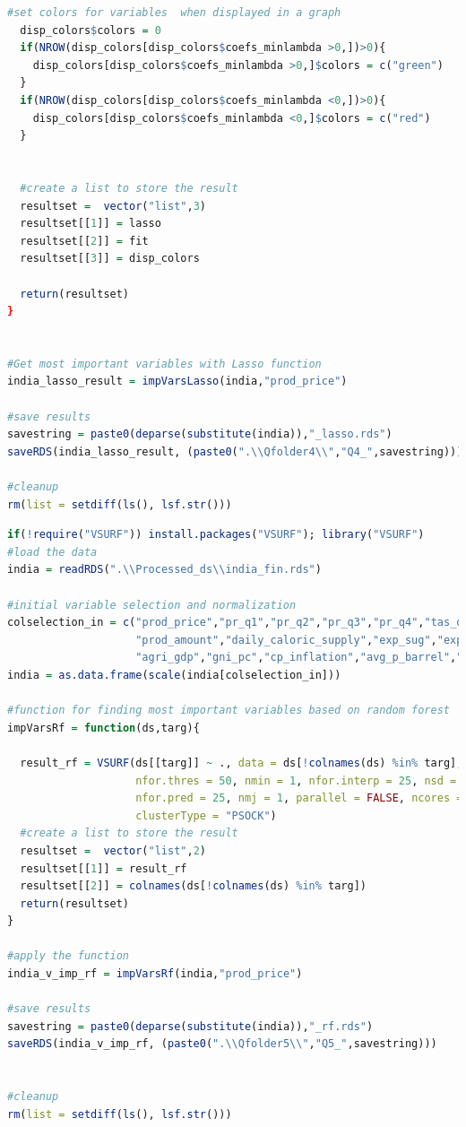 \documentclass[11pt]{article}
\begin{document}
\begin{lstlisting}[language= R]
  #set colors for variables  when displayed in a graph
  disp_colors$colors = 0
  if(NROW(disp_colors[disp_colors$coefs_minlambda >0,])>0){
    disp_colors[disp_colors$coefs_minlambda >0,]$colors = c("green")
  }
  if(NROW(disp_colors[disp_colors$coefs_minlambda <0,])>0){
    disp_colors[disp_colors$coefs_minlambda <0,]$colors = c("red")
  }
  
  
  #create a list to store the result
  resultset =  vector("list",3)
  resultset[[1]] = lasso
  resultset[[2]] = fit
  resultset[[3]] = disp_colors
  
  return(resultset)
}


#Get most important variables with Lasso function
india_lasso_result = impVarsLasso(india,"prod_price")

#save results
savestring = paste0(deparse(substitute(india)),"_lasso.rds")
saveRDS(india_lasso_result, (paste0(".\\Qfolder4\\","Q4_",savestring)))

#cleanup
rm(list = setdiff(ls(), lsf.str()))
\end{lstlisting}


\begin{lstlisting}[language= R]
if(!require("VSURF")) install.packages("VSURF"); library("VSURF")
#load the data
india = readRDS(".\\Processed_ds\\india_fin.rds")

#initial variable selection and normalization
colselection_in = c("prod_price","pr_q1","pr_q2","pr_q3","pr_q4","tas_q1","tas_q2","tas_q3","tas_q4",
                    "prod_amount","daily_caloric_supply","exp_sug","exp_veg","exp_cer","imp_sug","imp_veg","imp_cer", 
                    "agri_gdp","gni_pc","cp_inflation","avg_p_barrel","population") 
india = as.data.frame(scale(india[colselection_in]))

#function for finding most important variables based on random forest  
impVarsRf = function(ds,targ){
  
  result_rf = VSURF(ds[[targ]] ~ ., data = ds[!colnames(ds) %in% targ], ntree = 2000,
                    nfor.thres = 50, nmin = 1, nfor.interp = 25, nsd = 1,
                    nfor.pred = 25, nmj = 1, parallel = FALSE, ncores = detectCores() - 1,
                    clusterType = "PSOCK")
  #create a list to store the result
  resultset =  vector("list",2)  
  resultset[[1]] = result_rf
  resultset[[2]] = colnames(ds[!colnames(ds) %in% targ])
  return(resultset)
}

#apply the function
india_v_imp_rf = impVarsRf(india,"prod_price")

#save results
savestring = paste0(deparse(substitute(india)),"_rf.rds")
saveRDS(india_v_imp_rf, (paste0(".\\Qfolder5\\","Q5_",savestring)))


#cleanup
rm(list = setdiff(ls(), lsf.str()))
\end{lstlisting}
\end{document}
